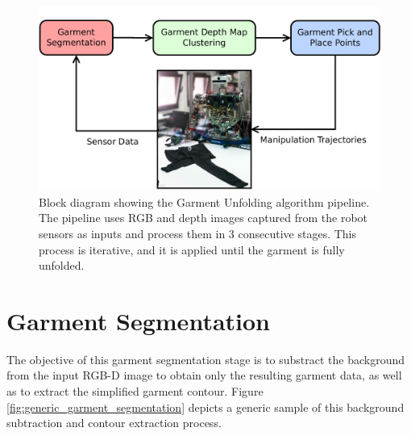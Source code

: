 \begin{figure}[thpb]
    \centering
    \includegraphics[width=\textwidth]
    {figures/Main_diagram.pdf}
    \caption[Block diagram showing the Garment Unfolding algorithm  pipeline.]
    {Block diagram showing the Garment Unfolding algorithm pipeline. The pipeline uses RGB and depth images captured from the robot sensors as inputs and process them in 3 consecutive stages. This process is iterative, and it is applied until the garment is fully unfolded.}
    \label{fig:pipeline_block_diagram}
\end{figure}

\section{Garment Segmentation}
\label{architecture:garment_segmentation}

The objective of this garment segmentation stage is to substract the background from the input RGB-D image to obtain only the resulting garment data, as well as to extract the simplified garment contour. Figure \ref{fig:generic_garment_segmentation} depicts a generic sample of this background subtraction and contour extraction process.




